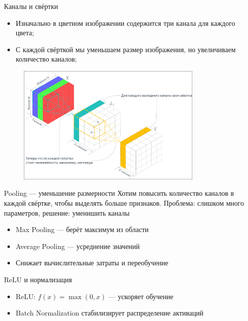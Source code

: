 \documentclass[notheorems, handout]{beamer}
\begin{document}
\begin{frame}{Каналы и свёртки}
    \begin{itemize}
        \item Изначально в цветном изображении содержится три канала для каждого цвета;
        \item С каждой свёрткой мы уменьшаем размер изображения, но увеличиваем количество каналов;
    \end{itemize}
    \begin{figure}
        \includegraphics[width=0.8\textwidth]{img/canals.png}
    \end{figure}
\end{frame}

\begin{frame}{Pooling — уменьшение размерности}
    Хотим повысить количество каналов в каждой свёртке, чтобы выделять больше признаков. Проблема: слишком много параметров, решение: уменишить каналы
\begin{itemize}
    \item Max Pooling — берёт максимум из области
    \item Average Pooling — усреднение значений
    \item Снижает вычислительные затраты и переобучение
\end{itemize}
\end{frame}

\begin{frame}{ReLU и нормализация}
\begin{itemize}
    \item ReLU: $f(x) = \max(0, x)$ — ускоряет обучение
    \item Batch Normalization стабилизирует распределение активаций
\end{itemize}
\end{frame}
\end{document}
